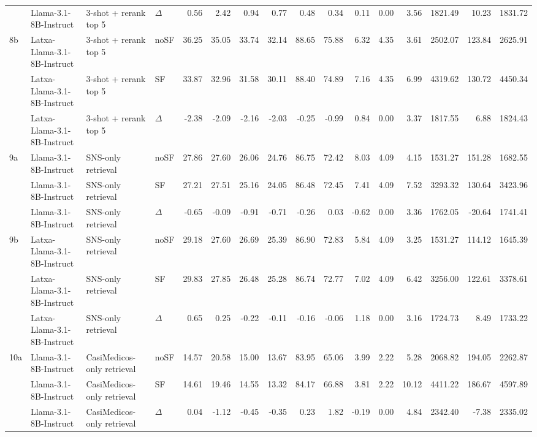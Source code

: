 \begin{landscape}
\begin{footnotesize}
\begin{longtable}{l l l l r r r r r r r r r r r r}
 & Llama-3.1-8B-Instruct & 3-shot + rerank top 5 & $\Delta$ & 0.56 & 2.42 & 0.94 & 0.77 & 0.48 & 0.34 & 0.11 & 0.00 & 3.56 & 1821.49 & 10.23 & 1831.72 \\
\rowcolor{tabhighlight}\textrightarrow{} 8b & Latxa-Llama-3.1-8B-Instruct & 3-shot + rerank top 5 & noSF & 36.25 & 35.05 & 33.74 & 32.14 & 88.65 & 75.88 & 6.32 & 4.35 & 3.61 & 2502.07 & 123.84 & 2625.91 \\
 & Latxa-Llama-3.1-8B-Instruct & 3-shot + rerank top 5 & SF & 33.87 & 32.96 & 31.58 & 30.11 & 88.40 & 74.89 & 7.16 & 4.35 & 6.99 & 4319.62 & 130.72 & 4450.34 \\
 & Latxa-Llama-3.1-8B-Instruct & 3-shot + rerank top 5 & $\Delta$ & -2.38 & -2.09 & -2.16 & -2.03 & -0.25 & -0.99 & 0.84 & 0.00 & 3.37 & 1817.55 & 6.88 & 1824.43 \\
\midrule
9a & Llama-3.1-8B-Instruct & SNS-only retrieval & noSF & 27.86 & 27.60 & 26.06 & 24.76 & 86.75 & 72.42 & 8.03 & 4.09 & 4.15 & 1531.27 & 151.28 & 1682.55 \\
 & Llama-3.1-8B-Instruct & SNS-only retrieval & SF & 27.21 & 27.51 & 25.16 & 24.05 & 86.48 & 72.45 & 7.41 & 4.09 & 7.52 & 3293.32 & 130.64 & 3423.96 \\
 & Llama-3.1-8B-Instruct & SNS-only retrieval & $\Delta$ & -0.65 & -0.09 & -0.91 & -0.71 & -0.26 & 0.03 & -0.62 & 0.00 & 3.36 & 1762.05 & -20.64 & 1741.41 \\
9b & Latxa-Llama-3.1-8B-Instruct & SNS-only retrieval & noSF & 29.18 & 27.60 & 26.69 & 25.39 & 86.90 & 72.83 & 5.84 & 4.09 & 3.25 & 1531.27 & 114.12 & 1645.39 \\
 & Latxa-Llama-3.1-8B-Instruct & SNS-only retrieval & SF & 29.83 & 27.85 & 26.48 & 25.28 & 86.74 & 72.77 & 7.02 & 4.09 & 6.42 & 3256.00 & 122.61 & 3378.61 \\
 & Latxa-Llama-3.1-8B-Instruct & SNS-only retrieval & $\Delta$ & 0.65 & 0.25 & -0.22 & -0.11 & -0.16 & -0.06 & 1.18 & 0.00 & 3.16 & 1724.73 & 8.49 & 1733.22 \\
\midrule
10a & Llama-3.1-8B-Instruct & CasiMedicos-only retrieval & noSF & 14.57 & 20.58 & 15.00 & 13.67 & 83.95 & 65.06 & 3.99 & 2.22 & 5.28 & 2068.82 & 194.05 & 2262.87 \\
 & Llama-3.1-8B-Instruct & CasiMedicos-only retrieval & SF & 14.61 & 19.46 & 14.55 & 13.32 & 84.17 & 66.88 & 3.81 & 2.22 & 10.12 & 4411.22 & 186.67 & 4597.89 \\
 & Llama-3.1-8B-Instruct & CasiMedicos-only retrieval & $\Delta$ & 0.04 & -1.12 & -0.45 & -0.35 & 0.23 & 1.82 & -0.19 & 0.00 & 4.84 & 2342.40 & -7.38 & 2335.02 \\

\end{longtable}
\end{footnotesize}
\end{landscape}
